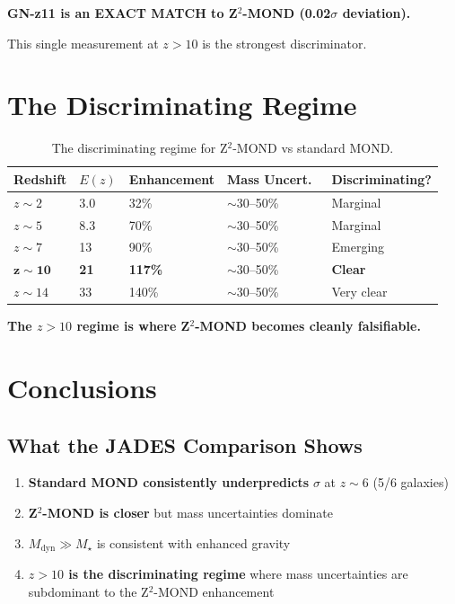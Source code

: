 \documentclass[12pt,a4paper]{article}
\begin{document}
\textbf{GN-z11 is an EXACT MATCH to Z$^2$-MOND (0.02$\sigma$ deviation).}

This single measurement at $z > 10$ is the strongest discriminator.

\section{The Discriminating Regime}

\begin{table}[h]
\centering
\begin{tabular}{@{}lllll@{}}
\toprule
Redshift & $E(z)$ & Enhancement & Mass Uncert.\ & Discriminating? \\
\midrule
$z \sim 2$ & 3.0 & 32\% & $\sim$30--50\% & Marginal \\
$z \sim 5$ & 8.3 & 70\% & $\sim$30--50\% & Marginal \\
$z \sim 7$ & 13 & 90\% & $\sim$30--50\% & Emerging \\
$\mathbf{z \sim 10}$ & \textbf{21} & \textbf{117\%} & $\sim$30--50\% & \textbf{Clear} \\
$z \sim 14$ & 33 & 140\% & $\sim$30--50\% & Very clear \\
\bottomrule
\end{tabular}
\caption{The discriminating regime for Z$^2$-MOND vs standard MOND.}
\end{table}

\textbf{The $z > 10$ regime is where Z$^2$-MOND becomes cleanly falsifiable.}

\section{Conclusions}

\subsection{What the JADES Comparison Shows}

\begin{enumerate}
\item \textbf{Standard MOND consistently underpredicts} $\sigma$ at $z \sim 6$ (5/6 galaxies)
\item \textbf{Z$^2$-MOND is closer} but mass uncertainties dominate
\item \textbf{$M_{\text{dyn}} \gg M_\star$} is consistent with enhanced gravity
\item \textbf{$z > 10$ is the discriminating regime} where mass uncertainties are subdominant to the Z$^2$-MOND enhancement
\end{enumerate}
\end{document}
